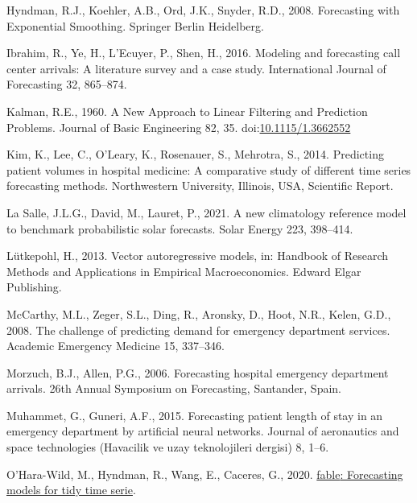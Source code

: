 \documentclass[]{elsarticle} %
\newlength{\cslhangindent}
\newlength{\cslentryspacingunit} %
\newenvironment{CSLReferences}[2] %
 {%
  \setlength{\parindent}{0pt}
  \ifodd #1
  \let\oldpar\par
  \def\par{\hangindent=\cslhangindent\oldpar}
  \fi
  \setlength{\parskip}{#2\cslentryspacingunit}
 }%
 {}
\begin{document}
\begin{CSLReferences}{1}{0}
\leavevmode{}%
Hyndman, R.J., Koehler, A.B., Ord, J.K., Snyder, R.D., 2008. {Forecasting with Exponential Smoothing}. Springer Berlin Heidelberg.

\leavevmode{}%
Ibrahim, R., Ye, H., L'Ecuyer, P., Shen, H., 2016. Modeling and forecasting call center arrivals: A literature survey and a case study. International Journal of Forecasting 32, 865--874.

\leavevmode{}%
Kalman, R.E., 1960. {A New Approach to Linear Filtering and Prediction Problems}. Journal of Basic Engineering 82, 35. doi:\href{https://doi.org/10.1115/1.3662552}{10.1115/1.3662552}

\leavevmode{}%
Kim, K., Lee, C., O'Leary, K., Rosenauer, S., Mehrotra, S., 2014. Predicting patient volumes in hospital medicine: A comparative study of different time series forecasting methods. Northwestern University, Illinois, USA, Scientific Report.

\leavevmode{}%
La Salle, J.L.G., David, M., Lauret, P., 2021. A new climatology reference model to benchmark probabilistic solar forecasts. Solar Energy 223, 398--414.

\leavevmode{}%
Lütkepohl, H., 2013. Vector autoregressive models, in: Handbook of Research Methods and Applications in Empirical Macroeconomics. Edward Elgar Publishing.

\leavevmode{}%
McCarthy, M.L., Zeger, S.L., Ding, R., Aronsky, D., Hoot, N.R., Kelen, G.D., 2008. The challenge of predicting demand for emergency department services. Academic Emergency Medicine 15, 337--346.

\leavevmode{}%
Morzuch, B.J., Allen, P.G., 2006. Forecasting hospital emergency department arrivals. 26th Annual Symposium on Forecasting, Santander, Spain.

\leavevmode{}%
Muhammet, G., Guneri, A.F., 2015. Forecasting patient length of stay in an emergency department by artificial neural networks. Journal of aeronautics and space technologies (Havacilik ve uzay teknolojileri dergisi) 8, 1--6.

\leavevmode{}%
O'Hara-Wild, M., Hyndman, R., Wang, E., Caceres, G., 2020. \href{https://fable.tidyverts.org/}{{fable}: Forecasting models for tidy time serie}.


\end{CSLReferences}
\end{document}

